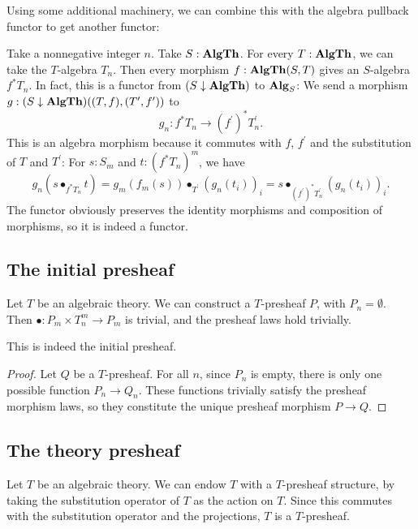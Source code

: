 Using some additional machinery, we can combine this with the algebra pullback functor to get another functor:
\begin{definition}\label{def:theory-algebra-pullback-functor}
  Take a nonnegative integer $ n $. Take $ S : \mathbf{AlgTh} $. For every $ T : \mathbf{AlgTh} $, we can take the $ T $-algebra $ T_n $. Then every morphism $ f: \mathbf{AlgTh}(S, T) $ gives an $ S $-algebra $ f^* T_n $. In fact, this is a functor from $ (S \downarrow \mathbf{AlgTh}) $ to $ \mathbf{Alg}_{S} $: We send a morphism $ g: (S \downarrow \mathbf{AlgTh})((T, f), (T^\prime, f^\prime)) $ to
  \[ g_n: f^* T_n \to (f^\prime)^* T^\prime_n. \]
  This is an algebra morphism because it commutes with $ f $, $ f^\prime $ and the substitution of $ T $ and $ T^\prime $: For $ s: S_m $ and $ t: (f^* T_n)^m $, we have
  \[
      g_n(s \bullet_{f^* T_n} t)
    = g_m(f_m(s)) \bullet_{T^\prime} (g_n(t_i))_i
    = s \bullet_{(f^\prime)^* T^\prime_n} (g_n(t_i))_i.
  \]
  The functor obviously preserves the identity morphisms and composition of morphisms, so it is indeed a functor.
\end{definition}

\subsection{The initial presheaf}
\begin{example}
  Let $ T $ be an algebraic theory. We can construct a $ T $-presheaf $ P $, with $ P_n = \emptyset $. Then $ \bullet : P_m \times T_n^m \to P_m $ is trivial, and the presheaf laws hold trivially.
\end{example}

\begin{lemma}
  This is indeed the initial presheaf.
\end{lemma}
\begin{proof}
  Let $ Q $ be a $ T $-presheaf. For all $ n $, since $ P_n $ is empty, there is only one possible function $ P_n \to Q_n $. These functions trivially satisfy the presheaf morphism laws, so they constitute the unique presheaf morphism $ P \to Q $.
\end{proof}

\subsection{The theory presheaf}
\begin{example}
  Let $ T $ be an algebraic theory. We can endow $ T $ with a $ T $-presheaf structure, by taking the substitution operator of $ T $ as the action on $ T $. Since this commutes with the substitution operator and the projections, $ T $ is a $ T $-presheaf.
\end{example}

